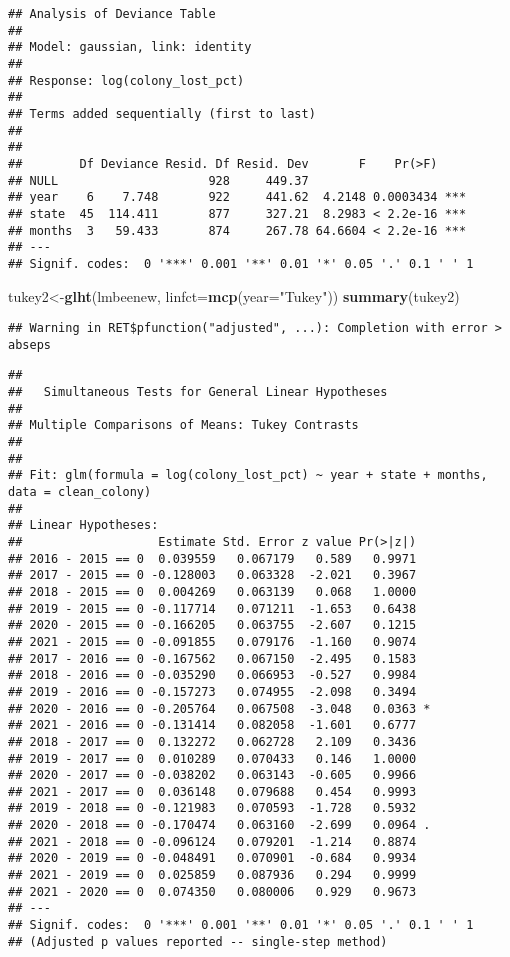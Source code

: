 \documentclass[
]{article}
\newenvironment{Shaded}{\begin{snugshade}}{\end{snugshade}}
\newcommand{\AttributeTok}[1]{\textcolor[rgb]{0.13,0.29,0.53}{#1}}
\newcommand{\FunctionTok}[1]{\textcolor[rgb]{0.13,0.29,0.53}{\textbf{#1}}}
\newcommand{\NormalTok}[1]{#1}
\newcommand{\OtherTok}[1]{\textcolor[rgb]{0.56,0.35,0.01}{#1}}
\newcommand{\StringTok}[1]{\textcolor[rgb]{0.31,0.60,0.02}{#1}}
\begin{document}
\begin{verbatim}
## Analysis of Deviance Table
## 
## Model: gaussian, link: identity
## 
## Response: log(colony_lost_pct)
## 
## Terms added sequentially (first to last)
## 
## 
##        Df Deviance Resid. Df Resid. Dev       F    Pr(>F)    
## NULL                     928     449.37                      
## year    6    7.748       922     441.62  4.2148 0.0003434 ***
## state  45  114.411       877     327.21  8.2983 < 2.2e-16 ***
## months  3   59.433       874     267.78 64.6604 < 2.2e-16 ***
## ---
## Signif. codes:  0 '***' 0.001 '**' 0.01 '*' 0.05 '.' 0.1 ' ' 1
\end{verbatim}

\begin{Shaded}
\begin{Highlighting}[]
\NormalTok{tukey2}\OtherTok{\textless{}{-}}\FunctionTok{glht}\NormalTok{(lmbeenew, }\AttributeTok{linfct=}\FunctionTok{mcp}\NormalTok{(}\AttributeTok{year=}\StringTok{"Tukey"}\NormalTok{))}
\FunctionTok{summary}\NormalTok{(tukey2)}
\end{Highlighting}
\end{Shaded}

\begin{verbatim}
## Warning in RET$pfunction("adjusted", ...): Completion with error > abseps
\end{verbatim}

\begin{verbatim}
## 
##   Simultaneous Tests for General Linear Hypotheses
## 
## Multiple Comparisons of Means: Tukey Contrasts
## 
## 
## Fit: glm(formula = log(colony_lost_pct) ~ year + state + months, data = clean_colony)
## 
## Linear Hypotheses:
##                   Estimate Std. Error z value Pr(>|z|)  
## 2016 - 2015 == 0  0.039559   0.067179   0.589   0.9971  
## 2017 - 2015 == 0 -0.128003   0.063328  -2.021   0.3967  
## 2018 - 2015 == 0  0.004269   0.063139   0.068   1.0000  
## 2019 - 2015 == 0 -0.117714   0.071211  -1.653   0.6438  
## 2020 - 2015 == 0 -0.166205   0.063755  -2.607   0.1215  
## 2021 - 2015 == 0 -0.091855   0.079176  -1.160   0.9074  
## 2017 - 2016 == 0 -0.167562   0.067150  -2.495   0.1583  
## 2018 - 2016 == 0 -0.035290   0.066953  -0.527   0.9984  
## 2019 - 2016 == 0 -0.157273   0.074955  -2.098   0.3494  
## 2020 - 2016 == 0 -0.205764   0.067508  -3.048   0.0363 *
## 2021 - 2016 == 0 -0.131414   0.082058  -1.601   0.6777  
## 2018 - 2017 == 0  0.132272   0.062728   2.109   0.3436  
## 2019 - 2017 == 0  0.010289   0.070433   0.146   1.0000  
## 2020 - 2017 == 0 -0.038202   0.063143  -0.605   0.9966  
## 2021 - 2017 == 0  0.036148   0.079688   0.454   0.9993  
## 2019 - 2018 == 0 -0.121983   0.070593  -1.728   0.5932  
## 2020 - 2018 == 0 -0.170474   0.063160  -2.699   0.0964 .
## 2021 - 2018 == 0 -0.096124   0.079201  -1.214   0.8874  
## 2020 - 2019 == 0 -0.048491   0.070901  -0.684   0.9934  
## 2021 - 2019 == 0  0.025859   0.087936   0.294   0.9999  
## 2021 - 2020 == 0  0.074350   0.080006   0.929   0.9673  
## ---
## Signif. codes:  0 '***' 0.001 '**' 0.01 '*' 0.05 '.' 0.1 ' ' 1
## (Adjusted p values reported -- single-step method)
\end{verbatim}
\end{document}
